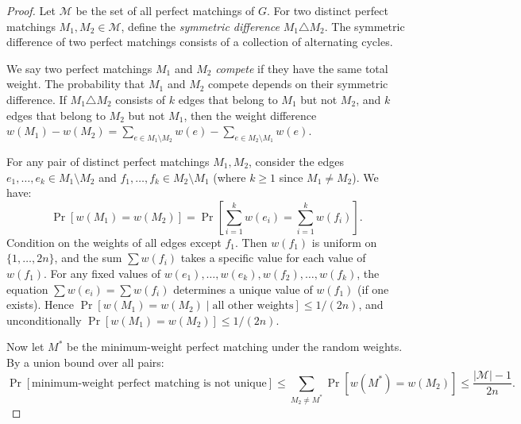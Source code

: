 \documentclass[twoside,12pt]{book}
\theoremstyle{plain}
\theoremstyle{definition}
\theoremstyle{remark}
\begin{document}
\begin{proof}
\iffalse
Let $\mathcal{M}$ be the set of all perfect matchings of $G$. For two distinct perfect matchings $M_1, M_2 \in \mathcal{M}$, define the \emph{symmetric difference} $M_1 \triangle M_2$. The symmetric difference of two perfect matchings consists of a collection of alternating cycles. 

We say two perfect matchings $M_1$ and $M_2$ \emph{compete} if they have the same total weight. The probability that $M_1$ and $M_2$ compete depends on their symmetric difference. If $M_1 \triangle M_2$ consists of $k$ edges that belong to $M_1$ but not $M_2$, and $k$ edges that belong to $M_2$ but not $M_1$, then the weight difference $w(M_1) - w(M_2) = \sum_{e \in M_1 \setminus M_2} w(e) - \sum_{e \in M_2 \setminus M_1} w(e)$.

For any pair of distinct perfect matchings $M_1, M_2$, consider the edges $e_1, \ldots, e_k \in M_1 \setminus M_2$ and $f_1, \ldots, f_k \in M_2 \setminus M_1$ (where $k \geq 1$ since $M_1 \neq M_2$). We have:
\[
\Pr[w(M_1) = w(M_2)] = \Pr\left[\sum_{i=1}^{k} w(e_i) = \sum_{i=1}^{k} w(f_i)\right].
\]
Condition on the weights of all edges except $f_1$. Then $w(f_1)$ is uniform on $\{1, \ldots, 2n\}$, and the sum $\sum w(f_i)$ takes a specific value for each value of $w(f_1)$. For any fixed values of $w(e_1), \ldots, w(e_k), w(f_2), \ldots, w(f_k)$, the equation $\sum w(e_i) = \sum w(f_i)$ determines a unique value of $w(f_1)$ (if one exists). Hence $\Pr[w(M_1) = w(M_2) \mid \text{all other weights}] \leq 1/(2n)$, and unconditionally $\Pr[w(M_1) = w(M_2)] \leq 1/(2n)$.

Now let $M^*$ be the minimum-weight perfect matching under the random weights. By a union bound over all pairs:
\[
\Pr[\text{minimum-weight perfect matching is not unique}] \leq \sum_{M_2 \neq M^*} \Pr[w(M^*) = w(M_2)] \leq \frac{|\mathcal{M}| - 1}{2n}.
\]


\end{proof}
\end{document}

